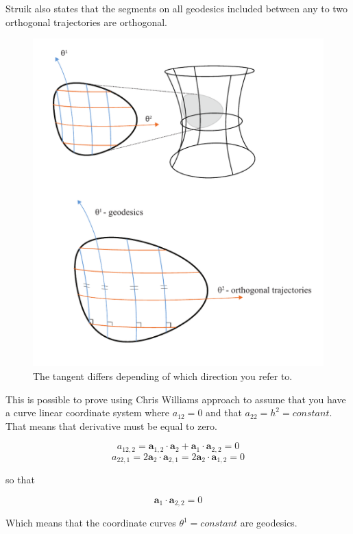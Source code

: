 Struik also states that the segments  on all geodesics included  between any to two orthogonal  trajectories are orthogonal.


\begin{figure}[H]
\centering
\includegraphics[height=0.8\linewidth ]{figure/Theory/SurfGeodesics.pdf}
\caption{The tangent differs depending of which direction you refer to. }
\end{figure}

This is possible to prove using Chris Williams approach to assume that you have a curve linear coordinate system where $a_{12} = 0$ and that $a_{22} = h^2 = constant$. That means that derivative must be equal to zero.

\begin{equation}
a_{12,2} = \textbf{a}_{1,2} \cdot \textbf{a}_2 + \textbf{a}_1 \cdot \textbf{a}_{2,2} = 0
\end{equation}
\begin{equation}
a_{22,1} = 2\textbf{a}_{2} \cdot \textbf{a}_{2,1} = 2\textbf{a}_{2} \cdot \textbf{a}_{1,2} = 0
\end{equation}

so that

\begin{equation}
\textbf{a}_1 \cdot \textbf{a}_{2,2} = 0
\end{equation}

Which means that the coordinate curves $\theta^1 = constant$ are geodesics. 

